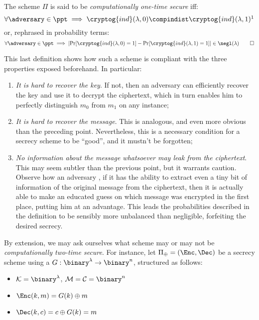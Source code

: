 \begin{definition}
    The scheme $\Pi$ is said to be \emph{computationally one-time secure} iff:
    \[
        \forall \adversary \in \ppt \implies \cryptog{ind}(\lambda, 0) \compindist \cryptog{ind}(\lambda, 1)\footnotemark
    \]  
    or, rephrased in probability terms:
    \[
        \forall \adversary \in \ppt \implies \lvert\Pr[\cryptog{ind}(\lambda, 0) = 1] - \Pr[\cryptog{ind}(\lambda, 1) = 1]\rvert \in \negl(\lambda) \qedhere
    \]
\end{definition}

This last definition shows how such a scheme is compliant with the three properties exposed beforehand. In particular:

\begin{enumerate}
    \item \emph{It is hard to recover the key}. If not, then an adversary \adversary{} can efficiently recover the key and use it to decrypt the ciphertext, which in turn enables him to perfectly distinguish $m_{0}$ from $m_{1}$ on any instance;
    \item \emph{It is hard to recover the message}. This is analogous, and even more obvious than the preceding point. Nevertheless, this is a necessary condition for a secrecy scheme to be ``good'', and it mustn't be forgotten;
    \item \emph{No information about the message whatsoever may leak from the ciphertext}. This may seem subtler than the previous point, but it warrants caution. Observe how an adversary \adversary{}, if it has the ability to extract even a tiny bit of information of the original message from the ciphertext, then it is actually able to make an educated guess on which message was encrypted in the first place, putting him at an advantage. This leads the probabilities described in the definition to be sensibly more unbalanced than negligible, forfeiting the desired secrecy.
\end{enumerate}

By extension, we may ask ourselves what scheme may or may not be \emph{computationally two-time secure}. For instance, let $\Pi_{\oplus} = (\Enc, \Dec)$ be a secrecy scheme using a \prg{} $G : \binary^\lambda \to \binary^n$, structured as follows:

\begin{itemize}
    \item $\K = \binary^\lambda$, $\M = \C= \binary^n$
    \item $\Enc(k, m) = G(k) \oplus m$
    \item $\Dec(k, c) = c \oplus G(k) = m$
\end{itemize}

